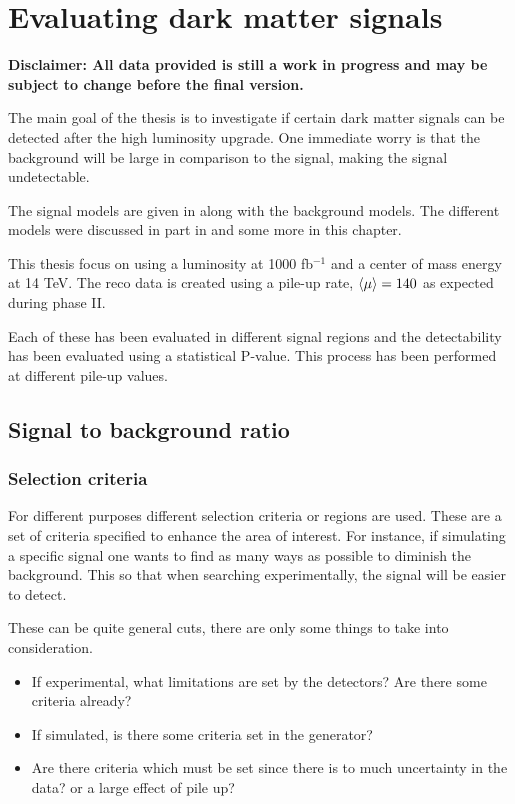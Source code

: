 \chapter{Evaluating dark matter signals}

\textbf{Disclaimer: All data provided is still a work in progress and may be subject to change before the final version.}

The main goal of the thesis is to investigate if certain dark matter signals can be detected after the high luminosity upgrade. One immediate worry is that the background will be large in comparison to the signal, making the signal undetectable. 

The signal models are given in  along with the background models. The different models were discussed in part in  and some more in this chapter.

This thesis focus on using a luminosity at 1000 fb$^{-1}$ and a center of mass energy at 14 TeV. The reco data is created using a pile-up rate, $\left<\mu\right> = 140$ as expected during phase II.

Each of these has been evaluated in different signal regions and the detectability has been evaluated using a statistical P-value. This process has been performed at different pile-up values. 

\newpage
\section{Signal to background ratio}
\subsection{Selection criteria}
For different purposes different selection criteria or regions are used. These are a set of criteria specified to enhance the area of interest. For instance, if simulating a specific signal one wants to find as many ways as possible to diminish the background. This so that when searching experimentally, the signal will be easier to detect.

These can be quite general cuts, there are only some things to take into consideration. 
\begin{itemize}
\item If experimental, what limitations are set by the detectors? Are there some criteria already?
\item If simulated, is there some criteria set in the generator?
\item Are there criteria which must be set since there is to much uncertainty in the data? or a large effect of pile up?
\end{itemize}



